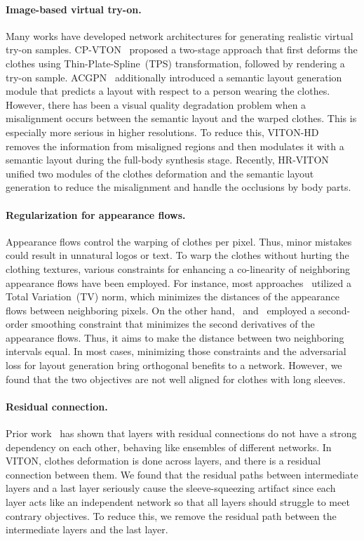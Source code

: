 \documentclass[letterpaper]{article} %
\begin{document}
\paragraph{Image-based virtual try-on.}
Many works have developed network architectures for generating realistic virtual try-on samples.
CP-VTON~\cite{wang2018toward} proposed a two-stage approach that first deforms the clothes using Thin-Plate-Spline~(TPS) transformation, followed by rendering a try-on sample.
ACGPN~\cite{yang2020towards} additionally introduced a semantic layout generation module that predicts a layout with respect to a person wearing the clothes.
However, there has been a visual quality degradation problem when a misalignment occurs between the semantic layout and the warped clothes.
This is especially more serious in higher resolutions.
To reduce this, VITON-HD~\cite{choi2021viton} removes the information from misaligned regions and then modulates it with a semantic layout during the full-body synthesis stage.
Recently, HR-VITON~\cite{lee2022hrviton} unified two modules of the clothes deformation and the semantic layout generation to reduce the misalignment and handle the occlusions by body parts.

\paragraph{Regularization for appearance flows.} 
Appearance flows control the warping of clothes per pixel.
Thus, minor mistakes could result in unnatural logos or text.
To warp the clothes without hurting the clothing textures, various constraints for enhancing a co-linearity of neighboring appearance flows have been employed.
For instance, most approaches~\cite{lee2022hrviton, han2019clothflow} utilized a Total Variation~(TV) norm, which minimizes the distances of the appearance flows between neighboring pixels.
On the other hand, \cite{choi2021viton}~and~\cite{ge2021parser} employed a second-order smoothing constraint that minimizes the second derivatives of the appearance flows.
Thus, it aims to make the distance between two neighboring intervals equal.
In most cases, minimizing those constraints and the adversarial loss for layout generation bring orthogonal benefits to a network.
However, we found that the two objectives are not well aligned for clothes with long sleeves.

\paragraph{Residual connection.} Prior work~\cite{veit2016residual} has shown that layers with residual connections do not have a strong dependency on each other, behaving like ensembles of different networks.
In VITON, clothes deformation is done across layers, and there is a residual connection between them.
We found that the residual paths between intermediate layers and a last layer seriously cause the sleeve-squeezing artifact since each layer acts like an independent network so that all layers should struggle to meet contrary objectives.
To reduce this, we remove the residual path between the intermediate layers and the last layer.
\end{document}
